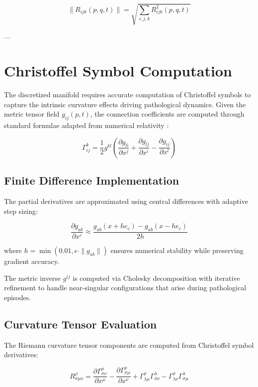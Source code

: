 \begin{equation}
\|R_{ijk}(p,q,t)\| = \sqrt{\sum_{i,j,k} R_{ijk}^2(p,q,t)}
\end{equation}

---

\section{Christoffel Symbol Computation}

The discretized manifold requires accurate computation of Christoffel symbols to capture the intrinsic curvature effects driving pathological dynamics. Given the metric tensor field $g_{ij}(p,t)$, the connection coefficients are computed through standard formulae adapted from numerical relativity \autocite{BaumgarteShapiro2010}:

\begin{equation}
\Gamma^k_{ij} = \frac{1}{2} g^{kl}\left(\frac{\partial g_{li}}{\partial x^j} + \frac{\partial g_{lj}}{\partial x^i} - \frac{\partial g_{ij}}{\partial x^l}\right)
\end{equation}

\subsection{Finite Difference Implementation}

The partial derivatives are approximated using central differences with adaptive step sizing:

\begin{equation}
\frac{\partial g_{ab}}{\partial x^c} \approx \frac{g_{ab}(x + h e_c) - g_{ab}(x - h e_c)}{2h}
\end{equation}

where $h = \min(0.01, \epsilon \cdot \|g_{ab}\|)$ ensures numerical stability while preserving gradient accuracy.

The metric inverse $g^{ij}$ is computed via Cholesky decomposition with iterative refinement to handle near-singular configurations that arise during pathological episodes.

\subsection{Curvature Tensor Evaluation}

The Riemann curvature tensor components are computed from Christoffel symbol derivatives:

\begin{equation}
R^{\rho}_{\sigma\mu\nu} = \frac{\partial \Gamma^{\rho}_{\sigma\nu}}{\partial x^{\mu}} - \frac{\partial \Gamma^{\rho}_{\sigma\mu}}{\partial x^{\nu}} + \Gamma^{\rho}_{\lambda\mu}\Gamma^{\lambda}_{\sigma\nu} - \Gamma^{\rho}_{\lambda\nu}\Gamma^{\lambda}_{\sigma\mu}
\end{equation}

